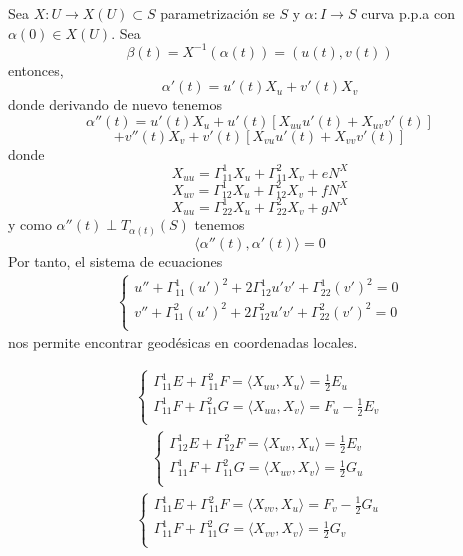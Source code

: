 \begin{prop}
  Sea $X : U \to X(U) \subset S$ parametrización se $S$ y $\alpha : I \to S$ curva p.p.a con $\alpha(0) \in X(U)$. Sea
  \[ 
    \beta(t) = X^{-1}(\alpha(t)) = (u(t), v(t))
  \] 
  entonces,
  \[ 
    \alpha'(t) = u'(t) X_{u} + v'(t) X_{v} 
  \] 
  donde derivando de nuevo tenemos
  \[ 
    \alpha''(t) = u'(t) X_{u} + u'(t)[X_{uu} u'(t) + X_{uv}v'(t)]
  \] 
  \[ 
    + v''(t) X_{v} + v'(t)[X_{vu} u'(t) + X_{vv}v'(t)] 
  \] 
  donde
  \[ 
    X_{uu} = \Gamma_{11}^{1} X_{u} + \Gamma_{11}^{2} X_{v} + e N^{X}
  \] 
  \[ 
    X_{uv} = \Gamma_{12}^{1} X_{u} + \Gamma_{12}^{2} X_{v} + f N^{X}
  \] 
  \[ 
    X_{uu} = \Gamma_{22}^{1} X_{u} + \Gamma_{22}^{2} X_{v} + g N^{X}
  \] 
  y como $\alpha''(t) \perp T_{\alpha(t)}(S)$ tenemos
  \[ 
    \langle \alpha''(t){ , }\alpha'(t) \rangle = 0
  \] 
  Por tanto, el sistema de ecuaciones
  \[ 
    \begin{aligned}
      \begin{cases}
        u'' + \Gamma_{11}^{1}(u')^{2} + 2\Gamma_{12}^{1}u' v' + \Gamma_{22}^{1}(v')^{2} = 0 \\
        v'' + \Gamma_{11}^{2}(u')^{2} + 2\Gamma_{12}^{2}u' v' + \Gamma_{22}^{2}(v')^{2} = 0 \\
      \end{cases}
    \end{aligned} 
  \] 
  nos permite encontrar geodésicas en coordenadas locales.
\end{prop}

\begin{nota}
  \[ 
    \begin{aligned}
      \begin{cases}
        \Gamma_{11}^{1} E + \Gamma_{11}^{2} F = \langle X_{uu}{ , }X_{u} \rangle = \frac{1}{2} E_{u} \\
        \Gamma_{11}^{1} F + \Gamma_{11}^{2} G = \langle X_{uu}{ , }X_{v} \rangle = F_{u} - \frac{1}{2} E_{v} \\
      \end{cases}
    \end{aligned} 
  \] 
  \[ 
    \begin{aligned}
      \begin{cases}
        \Gamma_{12}^{1} E + \Gamma_{12}^{2} F = \langle X_{uv}{ , }X_{u} \rangle = \frac{1}{2} E_{v} \\
        \Gamma_{11}^{1} F + \Gamma_{11}^{2} G = \langle X_{uv}{ , }X_{v} \rangle = \frac{1}{2}G_{u} \\
      \end{cases}
    \end{aligned} 
  \] 
  \[ 
    \begin{aligned}
      \begin{cases}
        \Gamma_{11}^{1} E + \Gamma_{11}^{2} F = \langle X_{vv}{ , }X_{u} \rangle = F_{v} - \frac{1}{2} G_{u} \\
        \Gamma_{11}^{1} F + \Gamma_{11}^{2} G = \langle X_{vv}{ , }X_{v} \rangle = \frac{1}{2} G_{v} \\
      \end{cases}
    \end{aligned} 
  \] 
\end{nota}

